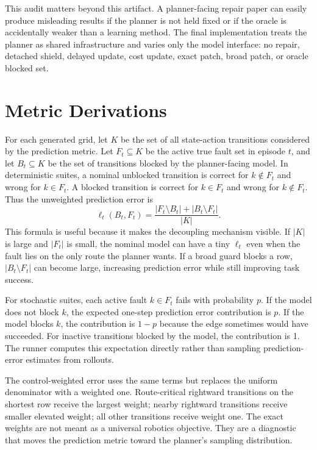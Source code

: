 \documentclass{article}
\begin{document}
This audit matters beyond this artifact. A planner-facing repair paper can easily produce misleading results if the planner is not held fixed or if the oracle is accidentally weaker than a learning method. The final implementation treats the planner as shared infrastructure and varies only the model interface: no repair, detached shield, delayed update, cost update, exact patch, broad patch, or oracle blocked set.

\section{Metric Derivations}

For each generated grid, let $K$ be the set of all state-action transitions considered by the prediction metric. Let $F_t\subseteq K$ be the active true fault set in episode $t$, and let $B_t\subseteq K$ be the set of transitions blocked by the planner-facing model. In deterministic suites, a nominal unblocked transition is correct for $k\notin F_t$ and wrong for $k\in F_t$. A blocked transition is correct for $k\in F_t$ and wrong for $k\notin F_t$. Thus the unweighted prediction error is
\[
    \ell_t(B_t,F_t)=\frac{|F_t\setminus B_t|+|B_t\setminus F_t|}{|K|}.
\]
This formula is useful because it makes the decoupling mechanism visible. If $|K|$ is large and $|F_t|$ is small, the nominal model can have a tiny $\ell_t$ even when the fault lies on the only route the planner wants. If a broad guard blocks a row, $|B_t\setminus F_t|$ can become large, increasing prediction error while still improving task success.

For stochastic suites, each active fault $k\in F_t$ fails with probability $p$. If the model does not block $k$, the expected one-step prediction error contribution is $p$. If the model blocks $k$, the contribution is $1-p$ because the edge sometimes would have succeeded. For inactive transitions blocked by the model, the contribution is 1. The runner computes this expectation directly rather than sampling prediction-error estimates from rollouts.

The control-weighted error uses the same terms but replaces the uniform denominator with a weighted one. Route-critical rightward transitions on the shortest row receive the largest weight; nearby rightward transitions receive smaller elevated weight; all other transitions receive weight one. The exact weights are not meant as a universal robotics objective. They are a diagnostic that moves the prediction metric toward the planner's sampling distribution.
\end{document}
